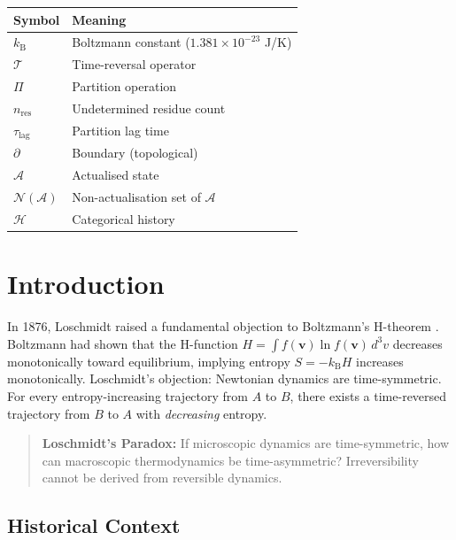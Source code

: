 \documentclass[twocolumn,10pt]{article}
\theoremstyle{definition}
\theoremstyle{remark}
\newcommand{\kB}{k_{\mathrm{B}}}
\begin{document}
\begin{center}
\begin{tabular}{ll}
\toprule
\textbf{Symbol} & \textbf{Meaning} \\
\midrule
$\kB$ & Boltzmann constant ($1.381 \times 10^{-23}$ J/K) \\
$\mathcal{T}$ & Time-reversal operator \\
$\Pi$ & Partition operation \\
$n_{\text{res}}$ & Undetermined residue count \\
$\tau_{\text{lag}}$ & Partition lag time \\
$\partial$ & Boundary (topological) \\
$\mathcal{A}$ & Actualised state \\
$\mathcal{N}(\mathcal{A})$ & Non-actualisation set of $\mathcal{A}$ \\
$\mathcal{H}$ & Categorical history \\
\bottomrule
\end{tabular}
\end{center}

\section{Introduction}
\label{sec:introduction}

In 1876, Loschmidt raised a fundamental objection to Boltzmann's H-theorem \citep{loschmidt1876}. Boltzmann had shown that the H-function $H = \int f(\mathbf{v}) \ln f(\mathbf{v}) \, d^3v$ decreases monotonically toward equilibrium, implying entropy $S = -\kB H$ increases monotonically. Loschmidt's objection: Newtonian dynamics are time-symmetric. For every entropy-increasing trajectory from $A$ to $B$, there exists a time-reversed trajectory from $B$ to $A$ with \textit{decreasing} entropy.

\begin{quote}
\textbf{Loschmidt's Paradox:} If microscopic dynamics are time-symmetric, how can macroscopic thermodynamics be time-asymmetric? Irreversibility cannot be derived from reversible dynamics.
\end{quote}

\subsection{Historical Context}
\end{document}
